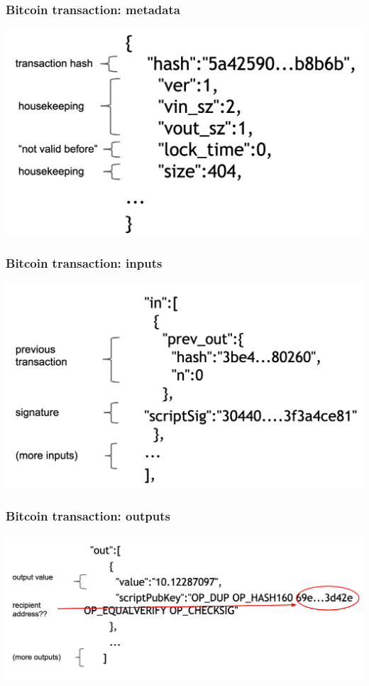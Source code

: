 \documentclass{beamer}
\begin{document}
\begin{frame}
  \frametitle{Bitcoin transaction: metadata}

\centering
	\includegraphics[scale=0.3]{4}
\end{frame}
\begin{frame}
  \frametitle{Bitcoin transaction: inputs}

\centering
	\includegraphics[scale=0.3]{5}
\end{frame}
\begin{frame}
  \frametitle{Bitcoin transaction: outputs}

\centering
	\includegraphics[scale=0.28]{6}
\end{frame}
\end{document}
